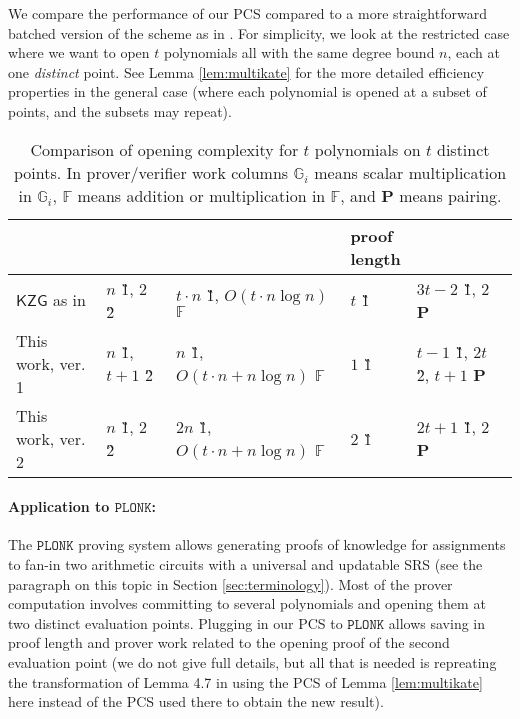 \documentclass[11pt]{article} %
\newcommand{\Gi}{\ensuremath{{\mathbb G}_i}\xspace}
\newcommand{\F}{\ensuremath{\mathbb F}\xspace}
\newcommand{\kate}{\ensuremath{\mathsf{KZG}}\xspace}
\newcommand{\plonk}{\ensuremath{\mathtt{PLONK}}\xspace}
\begin{document}
We compare the performance of our PCS compared to a more straightforward batched version of the \cite{kate} scheme as in \cite{plonk}.
For simplicity, we look at the restricted case where we want to open $t$ polynomials all with the same degree bound $n$, each at one \emph{distinct} point. See Lemma \ref{lem:multikate} for the more detailed efficiency properties in the general case (where each polynomial is opened at a subset of points, and the subsets may repeat).
\begin{table}[!htbp]
	\caption{Comparison of opening complexity for $t$ polynomials on $t$ distinct points. In prover/verifier work columns \Gi means scalar multiplication in \Gi, \F means addition or multiplication in \F, and \textbf{P} means pairing. }
	\centering
\begin{adjustbox}{width=1\textwidth}
	\begin{tabular}{l|l|l|l|l}
	& \thead{SRS size} & \thead{prover work} & \thead{proof\\ length} & \thead{verifier work} \\ \hline
		\kate as in \cite{plonk}
		         & $n$ \G1, $2$ \G2  & $t\cdot n$ \G1, $O(t\cdot n\log n)$ \F &   $t$ \G1 &  $3t-2$ \G1, $2$ \textbf{P}\\ \hline
		This work, ver. 1     & $n$ \G1, $t+1$ \G2 &   $n$ \G1, $O(t\cdot n + n\log n)$ \F  & $1$ \G1 & $t-1$ \G1, $2t$ \G2, $t+1$ \textbf{P}   \\ \hline
	This work, ver. 2     & $n$ \G1, $2$ \G2 &   $2n$ \G1, $O(t\cdot n + n\log n)$ \F  & $2$ \G1 & $2t+1$ \G1, $2$ \textbf{P}   \\ \hline

	\end{tabular}
\end{adjustbox}
\label{table:prover-work}
\end{table} 



\paragraph{Application to \plonk:}


The \plonk proving system \cite{plonk}  allows generating proofs of knowledge for assignments
to fan-in two arithmetic circuits with a universal and updatable SRS (see the paragraph on this topic in Section \ref{sec:terminology}). Most of the prover computation involves committing to several polynomials and opening them at two distinct evaluation points. Plugging in our PCS to \plonk allows saving in proof length and prover work related to the opening proof of the second evaluation point (we do not give full details, but all that is needed is repreating the transformation of Lemma 4.7 in \cite{plonk} using the PCS of Lemma \ref{lem:multikate} here instead of the PCS used there to obtain the new result).
\end{document}
